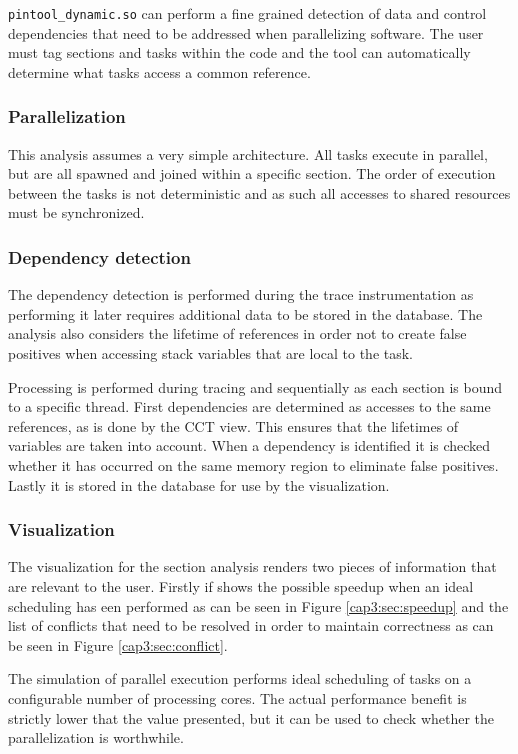 \texttt{pintool\_dynamic.so} can perform a fine grained detection of data and control dependencies that need to be addressed when parallelizing software. The user must tag sections and tasks within the code and the tool can automatically determine what tasks access a common reference.

\subsubsection{Parallelization}

This analysis assumes a very simple architecture. All tasks execute in parallel, but are all spawned and joined within a specific section. The order of execution between the tasks is not deterministic and as such all accesses to shared resources must be synchronized.

\subsubsection{Dependency detection}

The dependency detection is performed during the trace instrumentation as performing it later requires additional data to be stored in the database. The analysis also considers the lifetime of references in order not to create false positives when accessing stack variables that are local to the task.

Processing is performed during tracing and sequentially as each section is bound to a specific thread. First dependencies are determined as accesses to the same references, as is done by the CCT view. This ensures that the lifetimes of variables are taken into account. When a dependency is identified it is checked whether it has occurred on the same memory region to eliminate false positives. Lastly it is stored in the database for use by the visualization.

\subsubsection{Visualization}

The visualization for the section analysis renders two pieces of information that are relevant to the user. Firstly if shows the possible speedup when an ideal scheduling has een performed as can be seen in Figure \ref{cap3:sec:speedup} and the list of conflicts that need to be resolved in order to maintain correctness as can be seen in Figure \ref{cap3:sec:conflict}.

The simulation of parallel execution performs ideal scheduling of tasks on a configurable number of processing cores. The actual performance benefit is strictly lower that the value presented, but it can be used to check whether the parallelization is worthwhile. 

